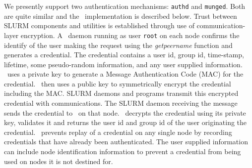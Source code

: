 
We presently support two authentication mechanisms: 
{\tt authd}\cite{Authd2002} and 
{\tt munged}. Both are quite similar and the \munged\ 
implementation is described below.
Trust between SLURM components and utilities is established through use
of communication-layer encryption.
A \munged\ daemon running as user {\tt root} on each node confirms the 
identify of the user making the request using the {\em getpeername} 
function and generates a credential. 
The credential contains a user id, 
group id, time-stamp, lifetime, some pseudo-random information, and 
any user supplied information. \munged\ uses a private key to 
generate a Message Authentication Code (MAC) for the credential.
\munged\ then uses a public key to symmetrically encrypt 
the credential including the MAC. 
SLURM daemons and programs transmit this encrypted 
credential with communications. The SLURM daemon receiving the message 
sends the credential to \munged\ on that node. 
\munged\ decrypts the credential using its private key, validates it 
and returns the user id and group id of the user originating the 
credential.
\munged\ prevents replay of a credential on any single node 
by recording credentials that have already been authenticated.
The user supplied information can include node identification information 
to prevent a credential from being used on nodes it is not destined for.

